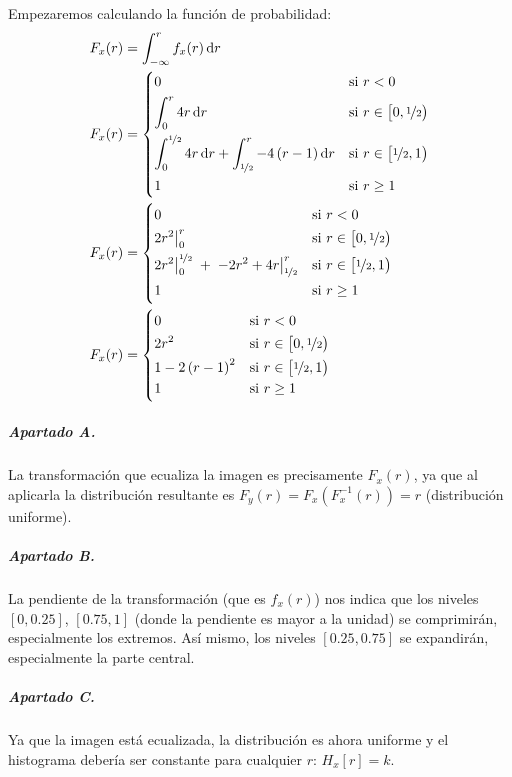 Empezaremos calculando la función de probabilidad:
%
\begin{align*}
  F_x(r) &= \int_{-\infty}^r f_x(r) \dif r
\\
  F_x(r) &= \begin{dcases}
    0 & \text{si $r < 0$}
  \\
    \int_0^r 4r \dif r
        & \text{si $r \in \left[0, \nicefrac{1}{2}\right)$}
  \\
    \int_0^{\nicefrac{1}{2}} 4r \dif r + \int_{\nicefrac{1}{2}}^{r} -4\left(r-1\right) \dif r
        & \text{si $r \in \left[\nicefrac{1}{2}, 1\right)$}
  \\
    1 & \text{si $r \geq 1$}
  \end{dcases}
\\
  F_x(r) &= \begin{dcases}
    0 & \text{si $r < 0$}
  \\
    \bigl. 2 r^2 \bigr|_0^r
        & \text{si $r \in \left[0, \nicefrac{1}{2}\right)$}
  \\
    \bigl. 2 r^2 \bigr|_0^{\nicefrac{1}{2}} \; + \; \bigl. -2r^2 +4r\bigr|_{\nicefrac{1}{2}}^{r}
        & \text{si $r \in \left[\nicefrac{1}{2}, 1\right)$}
  \\
    1 & \text{si $r \geq 1$}
  \end{dcases}
\\
  F_x(r) &= \begin{dcases}
    0 & \text{si $r < 0$}
  \\
    2 r^2
        & \text{si $r \in \left[0, \nicefrac{1}{2}\right)$}
  \\
    1 - 2 \left(r-1\right)^2
        & \text{si $r \in \left[\nicefrac{1}{2}, 1\right)$}
  \\
    1 & \text{si $r \geq 1$}
  \end{dcases}
\end{align*}

\subparagraph{Apartado A.}

La transformación que ecualiza la imagen es precisamente $F_x(r)$, ya que
al aplicarla la distribución resultante es
$F_y(r) = F_x\left(F_x^{-1}(r)\right) = r$ (distribución uniforme).

\subparagraph{Apartado B.}

La pendiente de la transformación (que es $f_x(r)$) nos indica que los niveles
$\left[0, \num{0.25}\right]$, $\left[\num{0.75}, 1\right]$ (donde la pendiente
es mayor a la unidad) se comprimirán, especialmente los extremos. Así mismo,
los niveles $\left[\num{0.25}, \num{0.75}\right]$ se expandirán, especialmente
la parte central.

\subparagraph{Apartado C.}

Ya que la imagen está ecualizada, la distribución es ahora uniforme y el
histograma debería ser constante para cualquier $r$: $H_x[r] = k$.


\finishpage

